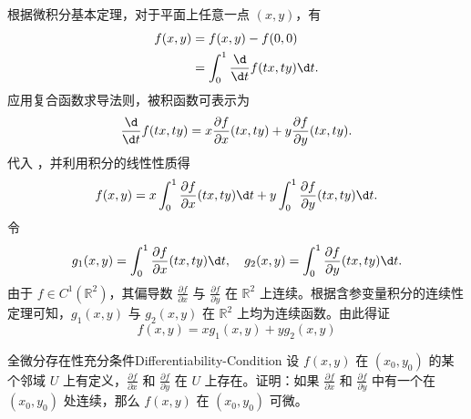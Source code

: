 \begin{myproof}
    根据微积分基本定理，对于平面上任意一点 $(x, y)$，有
    \begin{equation}
        \begin{aligned}
            f(x, y) & = f(x, y) - f(0, 0)                        \\
                    & = \int_0^1 \frac{\d}{\d t} f(tx, ty) \d t.
        \end{aligned} \label{eq:FTC-Expansion}
    \end{equation}
    应用复合函数求导法则，被积函数可表示为
    \begin{equation}
        \frac{\d}{\d t} f(tx, ty) = x \frac{\partial f}{\partial x}(tx, ty) + y \frac{\partial f}{\partial y}(tx, ty).
    \end{equation}
    代入 ，并利用积分的线性性质得
    \begin{equation}
        f(x, y) = x \int_0^1 \frac{\partial f}{\partial x}(tx, ty) \d t + y \int_0^1 \frac{\partial f}{\partial y}(tx, ty) \d t.
    \end{equation}
    令
    \begin{equation}
        g_1(x, y) = \int_0^1 \frac{\partial f}{\partial x}(tx, ty) \d t, \quad g_2(x, y) = \int_0^1 \frac{\partial f}{\partial y}(tx, ty) \d t.
    \end{equation}
    由于 $f \in C^1(\mathbb{R}^2)$，其偏导数 $\frac{\partial f}{\partial x}$ 与 $\frac{\partial f}{\partial y}$ 在 $\mathbb{R}^2$ 上连续。根据含参变量积分的连续性定理可知，$g_1(x, y)$ 与 $g_2(x, y)$ 在 $\mathbb{R}^2$ 上均为连续函数。由此得证
    \begin{equation}
        \boxed{f(x, y) = x g_1(x, y) + y g_2(x, y)}
    \end{equation}
\end{myproof}


\begin{problem}{全微分存在性充分条件}{Differentiability-Condition}
    设 $f(x, y)$ 在 $(x_0, y_0)$ 的某个邻域 $U$ 上有定义，$\frac{\partial f}{\partial x}$ 和 $\frac{\partial f}{\partial y}$ 在 $U$ 上存在。证明：如果 $\frac{\partial f}{\partial x}$ 和 $\frac{\partial f}{\partial y}$ 中有一个在 $(x_0, y_0)$ 处连续，那么 $f(x, y)$ 在 $(x_0, y_0)$ 可微。
\end{problem}

